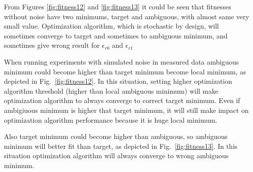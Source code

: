 \documentclass[conference]{IEEEtran}
\begin{document}
\par
From Figures \ref{fig:fitness12} and \ref{fig:fitness13} 
it could be seen that fitnesses without noise have two minimums, 
target and ambiguous, with almost same very small value.
Optimization algorithm, which is stochastic by design,
will sometimes converge to target and sometimes to ambiguous minimum,
and sometimes give wrong result for $\epsilon_{r0}$ and $\epsilon_{r1}$
\par
When running experiments with simulated noise in measured data 
ambiguous minimum could become higher than target minimum become local minimum,
as depicted in Fig.~\ref{fig:fitness12}.
In this situation, setting higher optimization algorithm threshold 
(higher than local ambiguous minimum)
will make optimization algorithm to always converge to correct target minimum.
Even if ambigiuous minimum is higher that target minimum,
it will still make impact on optimization algorithm performance 
because it is huge local minimum.
\par
Also target minimum could become higher than ambiguous,
so ambiguous minimum will better fit than target,
as depicted in Fig.~\ref{fig:fitness13}.
In this situation optimization algorithm will always converge to wrong ambiguous minimum.
\end{document}
